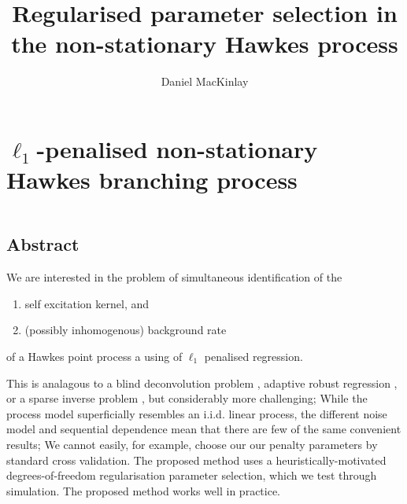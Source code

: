 \documentclass[11pt]{article}
\title{Regularised parameter selection in the non-stationary Hawkes process}
\author{Daniel MacKinlay}
\providecommand{\tightlist}{%
      \setlength{\itemsep}{0pt}\setlength{\parskip}{0pt}}
\newcommand{\var}{\operatorname{Var}}
\newcommand{\dd}{\mathrm{d}}
\newcommand{\bb}[1]{\mathbb{#1}}
\renewcommand{\bf}[1]{\mathbf{#1}}
\renewcommand{\v}[1]{\boldsymbol{#1}}
\newcommand{\m}[1]{\mathrm{#1}}
\newcommand{\cc}[1]{\mathcal{#1}}
\renewcommand{\cc}[1]{\mathcal{#1}}
\newcommand{\oo}[1]{\operatorname{#1}}
\begin{document}
    
    
    \maketitle
    
    

    
    \section{\texorpdfstring{\(\ell_1\)-penalised non-stationary Hawkes
branching
process}{\textbackslash{}ell\_1-penalised non-stationary Hawkes branching process}}\label{ell_1-penalised-non-stationary-hawkes-branching-process}





    \[
\renewcommand{\var}{\operatorname{Var}}
\renewcommand{\dd}{\mathrm{d}}
\renewcommand{\bb}[1]{\mathbb{#1}}
\renewcommand{\bf}[1]{\mathbf{#1}}
\renewcommand{\v}[1]{\boldsymbol{#1}}
\renewcommand{\m}[1]{\mathrm{#1}}
\renewcommand{\cc}[1]{\mathcal{#1}}
\renewcommand{\cc}[1]{\mathcal{#1}}
\renewcommand{\oo}[1]{\operatorname{#1}}
\]

    \subsection{Abstract}\label{abstract}

We are interested in the problem of simultaneous identification of the

\begin{enumerate}
\def\labelenumi{\arabic{enumi}.}
\tightlist
\item
  self excitation kernel, and
\item
  (possibly inhomogenous) background rate
\end{enumerate}

of a Hawkes point process a using of \(\ell_1\) penalised regression.

This is analagous to a blind deconvolution problem
\cite{stockham_blind_1975}, adaptive robust regression
\cite{donoho_automatic_1988}, or a sparse inverse problem
\cite{tibshirani_regression_1996}, but considerably more challenging;
While the process model superficially resembles an i.i.d. linear
process, the different noise model and sequential dependence mean that
there are few of the same convenient results; We cannot easily, for
example, choose our our penalty parameters by standard cross validation.
The proposed method uses a heuristically-motivated degrees-of-freedom
regularisation parameter selection, which we test through simulation.
The proposed method works well in practice.
\end{document}
